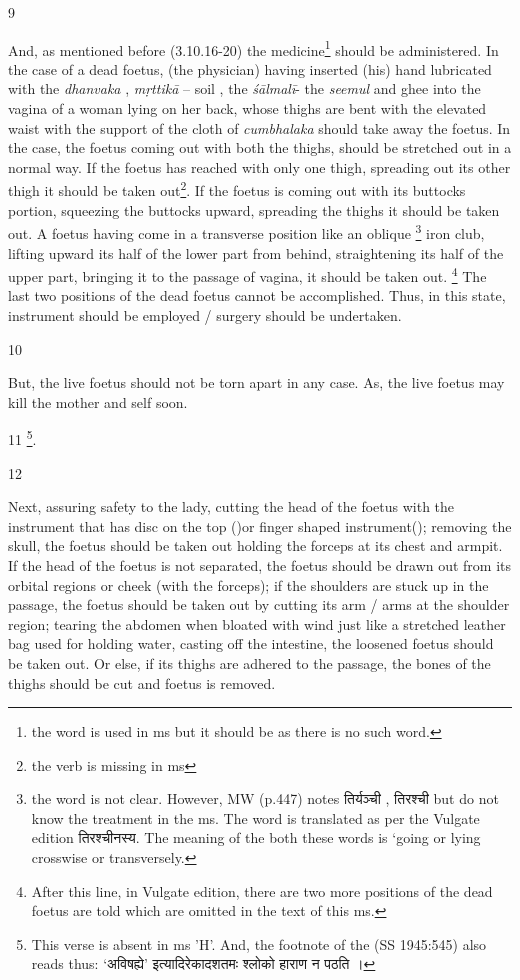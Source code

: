 \begin{translation}
\item[9] 

And, as mentioned before (3.10.16-20) the medicine\footnote{the word  is used in ms but it should be  as there is no such word.} should be
administered. In the case of a dead foetus, (the physician) having
inserted (his) hand lubricated with the \emph{dhanvaka} , \emph{mṛttikā} 
– soil ,
the \emph{śālmalī}- the \emph{seemul} and ghee into the vagina of a woman 
lying on her
back, whose thighs are bent with the elevated waist with the support of
the cloth of \emph{cumbhalaka}  should take away the foetus. In the case, 
the
foetus coming out with both the thighs, should be stretched out in a
normal way. If the foetus has reached with only one thigh, spreading out
its other thigh it should be taken out\footnote{the verb is missing in ms}. If the foetus is coming out with
its buttocks portion, squeezing the buttocks upward, spreading the thighs
it should be taken out. A foetus having come in a transverse position like
an oblique \footnote{the word is not clear. However, MW (p.447) notes तिर्यञ्ची , तिरश्ची but do not know the treatment in the ms. The word is translated as per the Vulgate edition तिरश्चीनस्य. The meaning of the both these words is ‘going or lying crosswise or transversely.} iron club, lifting upward its half of
the lower part from behind, straightening its half of the upper part,
bringing it to the passage of vagina, it should be taken out. \footnote{After this line, in Vulgate edition, there are two more positions of the dead foetus are told which are omitted in the text of this ms.} The last 
two positions of the dead foetus cannot be accomplished. Thus, in this
state, instrument should be employed / surgery should be undertaken.




\item[10] 

But, the live foetus should not be torn apart in any case. As, the live
foetus may kill the mother and self soon.

\item[11] \footnote{This verse is absent in ms 'H'. And, the footnote of the (SS 1945:545) also reads thus: ‘अविषह्ये’ इत्यादिरेकादशतमः श्लोको हाराण न पठति ।}.


\item[12]	

Next, assuring safety to the lady, cutting the head of the foetus with the
instrument that has disc on the top ()or finger shaped
instrument(); removing the skull, the foetus should be
taken out holding the forceps at its chest and armpit. If the head of the
foetus is not separated, the foetus should be drawn out from its orbital
regions or cheek (with the forceps); if the shoulders are stuck up in the
passage, the foetus should be taken out by cutting its arm / arms at
the shoulder region; tearing the abdomen when bloated with wind just like
a stretched leather bag used for holding water, casting off the
intestine, the loosened foetus should be taken out. Or else, if its thighs
are adhered to the passage, the bones of the thighs should be cut and
foetus is removed.


\end{translation}
